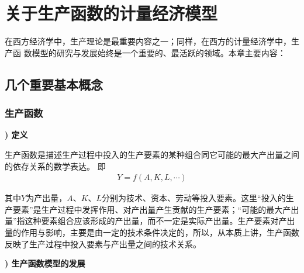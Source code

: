 
\chapter{关于生产函数的计量经济模型}

在西方经济学中，生产理论是最重要内容之一；同样，在西方的计量经济学中，生产函
数模型的研究与发展始终是一个重要的、最活跃的领域。本章主要内容：
\section{几个重要基本概念} 
\subsection{生产函数}

{\bf {}) 定义}
			
生产函数是描述生产过程中投入的生产要素的某种组合同它可能的最大产出量之间的依存关系的数学表达。
即
\begin{equation}
	\begin{aligned}
	    Y=f\left ( A, K, L, \cdots \right ) 
	\end{aligned}
\end{equation}
	 
其中$ Y $为产出量，$ A $、$ K $、$ L $分别为技术、资本、劳动等投入要素。这里“投入的生产要素”是生产过程中发挥作用、对产出量产生贡献的生产要素；“可能的最大产出量”指这种要素组合应该形成的产出量，而不一定是实际产出量。生产要素对产出量的作用与影响，主要是由一定的技术条件决定的，所以，从本质上讲，生产函数反映了生产过程中投入要素与产出量之间的技术关系。
		
{\bf {}) 生产函数模型的发展}

